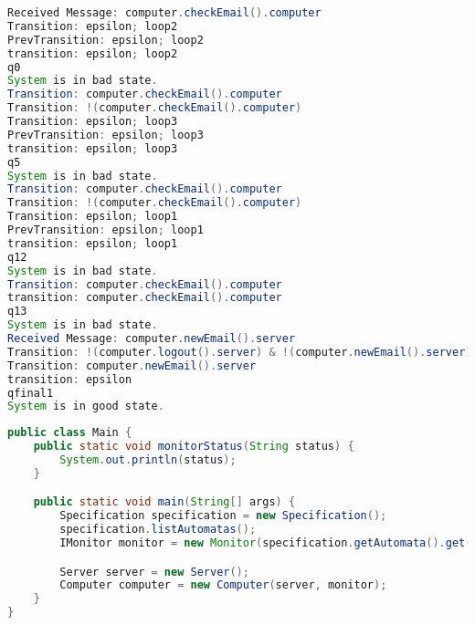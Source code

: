 \begin{lstlisting}[language=java, frame=single, float=ht!, caption={F.2.4. scenariohoz tartozó monitor kimenet.},captionpos=b]
Received Message: computer.checkEmail().computer
Transition: epsilon; loop2
PrevTransition: epsilon; loop2
transition: epsilon; loop2
q0
System is in bad state.
Transition: computer.checkEmail().computer
Transition: !(computer.checkEmail().computer)
Transition: epsilon; loop3
PrevTransition: epsilon; loop3
transition: epsilon; loop3
q5
System is in bad state.
Transition: computer.checkEmail().computer
Transition: !(computer.checkEmail().computer)
Transition: epsilon; loop1
PrevTransition: epsilon; loop1
transition: epsilon; loop1
q12
System is in bad state.
Transition: computer.checkEmail().computer
transition: computer.checkEmail().computer
q13
System is in bad state.
Received Message: computer.newEmail().server
Transition: !(computer.logout().server) & !(computer.newEmail().server)
Transition: computer.newEmail().server
transition: epsilon
qfinal1
System is in good state.
\end{lstlisting}

\begin{lstlisting}[language=java, frame=single, float=ht!, caption={F.2.4. scenariohoz tartozó Main osztály.},captionpos=b]
public class Main {
	public static void monitorStatus(String status) {
		System.out.println(status);
	}

	public static void main(String[] args) {
		Specification specification = new Specification();
		specification.listAutomatas();
		IMonitor monitor = new Monitor(specification.getAutomata().get(0));

		Server server = new Server();
		Computer computer = new Computer(server, monitor);
	}
}
\end{lstlisting}

